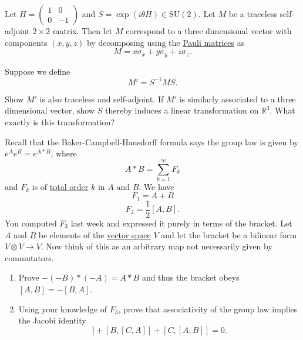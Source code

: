   \begin{exercise} 
    Let $H = \begin{pmatrix} 1 & 0 \\ 0 & -1 \end{pmatrix}$ and $S = \exp(i\theta H) \in \text{SU}(2)$. Let $M$ be a traceless self-adjoint $2 \times 2$ matrix. Then let $M$ correspond to a three dimensional vector with components $(x, y, z)$ by decomposing using the \hyperref[dg-def:pauli-matrices]{Pauli matrices} as
    \begin{equation}
      M = x\sigma_x + y\sigma_y + z\sigma_z.
    \end{equation}
    
    Suppose we define
    \begin{equation}
      M' = S^{-1}MS.
    \end{equation}
    
    Show $M'$ is also traceless and self-adjoint. If $M'$ is similarly associated to a three dimensional vector, show $S$ thereby induces a linear transformation on $\mathbb{R}^3$. What exactly is this transformation?
  \end{exercise}

  \begin{exercise} 
    Recall that the Baker-Campbell-Hausdorff formula says the group law is given by $e^A e^B = e^{A*B}$, where
    \begin{equation}
      A*B = \sum_{k=1}^{\infty} F_k
    \end{equation}
    and $F_k$ is of \hyperref[st-def:total-order]{total order} $k$ in $A$ and $B$. We have
    \begin{equation}
      F_1 = A+B
    \end{equation}
    \begin{equation}
      F_2 = \frac{1}{2}[A,B].
    \end{equation}
    You computed $F_3$ last week and expressed it purely in terms of the bracket. Let $A$ and $B$ be elements of the \hyperref[def:vector-space]{vector space} $V$ and let the bracket be a bilinear form $V \otimes V \to V$. Now think of this as an arbitrary map not necessarily given by commutators.
    \begin{enumerate}
      \item Prove $-(-B)*(-A) = A*B$ and thus the bracket obeys $[A,B] = -[B,A]$.
      \item Using your knowledge of $F_3$, prove that associativity of the group law implies the Jacobi identity
      \begin{equation}
        [A,[B,C]]+[B,[C,A]]+[C,[A,B]]=0.
      \end{equation}
    \end{enumerate}
  \end{exercise}

